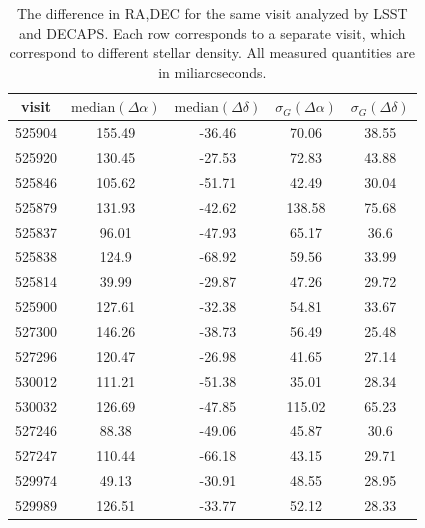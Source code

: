 \documentclass[DM,lsstdraft,toc,usenatbib]{lsstdoc}
\begin{document}
\begin{table}
\centering
\caption{The difference in RA,DEC for the same visit analyzed by LSST and DECAPS.  Each row corresponds to a separate visit, which correspond to different stellar density.  All  measured quantities are in miliarcseconds. }
\label{tab:radec_lsst_decaps}
\begin{tabular}{ccccc}
visit & $\mathrm{median}(\Delta\alpha)$ & $\mathrm{median}(\Delta\delta)$ & $\sigma_{G}(\Delta\alpha)$ & $\sigma_{G}(\Delta\delta)$ \\
\hline
525904 & 155.49 & -36.46 & 70.06 & 38.55 \\
525920 & 130.45 & -27.53 & 72.83 & 43.88 \\
525846 & 105.62 & -51.71 & 42.49 & 30.04 \\
525879 & 131.93 & -42.62 & 138.58 & 75.68 \\
525837 & 96.01 & -47.93 & 65.17 & 36.6 \\
525838 & 124.9 & -68.92 & 59.56 & 33.99 \\
525814 & 39.99 & -29.87 & 47.26 & 29.72 \\
525900 & 127.61 & -32.38 & 54.81 & 33.67 \\
527300 & 146.26 & -38.73 & 56.49 & 25.48 \\
527296 & 120.47 & -26.98 & 41.65 & 27.14 \\
530012 & 111.21 & -51.38 & 35.01 & 28.34 \\
530032 & 126.69 & -47.85 & 115.02 & 65.23 \\
527246 & 88.38 & -49.06 & 45.87 & 30.6 \\
527247 & 110.44 & -66.18 & 43.15 & 29.71 \\
529974 & 49.13 & -30.91 & 48.55 & 28.95 \\
529989 & 126.51 & -33.77 & 52.12 & 28.33 \\
\end{tabular}
\end{table}
\end{document}

